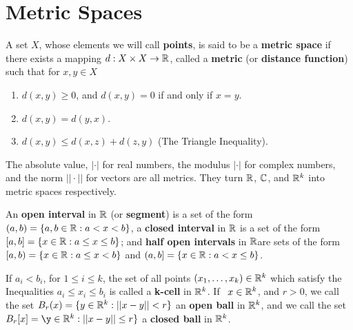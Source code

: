 
\section{Metric Spaces}

\begin{definition}
    A set $X$, whose elements we will call \textbf{points}, is said to be a \textbf{metric space} 
    if there exists a mapping $d:X \times X \rightarrow \mathbb{R}$, called a \textbf{metric} (or 
    \textbf{distance function}) such that for  $x,y \in X$
         \begin{enumerate}[label=(\arabic*)]
             \item $d(x,y) \geq 0$, and $d(x,y)=0$ if and only if $x=y$.

             \item $d(x,y)=d(y,x)$.

             \item $d(x,y) \leq d(x,z)+d(z,y)$ (The Triangle Inequality).
        \end{enumerate}
\end{definition}

\begin{example}
    The absolute value, $|\cdot|$ for real numbers, the modulus  $|\cdot|$ for 
    complex numbers, and the norm $||\cdot||$ for vectors are all metrics. They 
    turn  $\mathbb{R}$,  $\mathbb{C}$, and  $\mathbb{R}^k$ into metric spaces respectively.
\end{example} 

\begin{definition}
    An \textbf{open interval} in $\mathbb{R}$ (or \textbf{segment}) is a set of the form $(a,b)=\{a,b \in \mathbb{R}: a<x<b\}$, 
    a \textbf{closed interval} in $\mathbb{R}$ is a set of the form $[a,b]=\{x \in \mathbb{R}: a \leq x \leq b\}$; and 
    \textbf{half open intervals} in $\mathbb{R} $are sets of the form  $[a,b)=\{x \in \mathbb{R}: a \leq x <b\}$ and 
    $(a,b]=\{x \in \mathbb{R}: a<x \leq b\}$.

    If  $a_i < b_i$, for  $1 \leq i \leq k$, the set of all points  $(x_1, \dots, x_k) \in \mathbb{R}^k$ which 
    satisfy the Inequalities $a_i \leq x_i \leq b_i$ is called a \textbf{k-cell} in $\mathbb{R}^k$. If \
    $x \in \mathbb{R}^k$, and  $r>0$, we call the set  $B_r(x)=\{y \in \mathbb{R}^k: ||x-y||<r\}$ an 
    \textbf{open ball} in $\mathbb{R}^k$,  and we call the set  $B_r[x]=\y \in \R^k: ||x-y|| \leq r\}$ a 
    \textbf{closed ball} in $\mathbb{R}^k$.
\end{definition}

